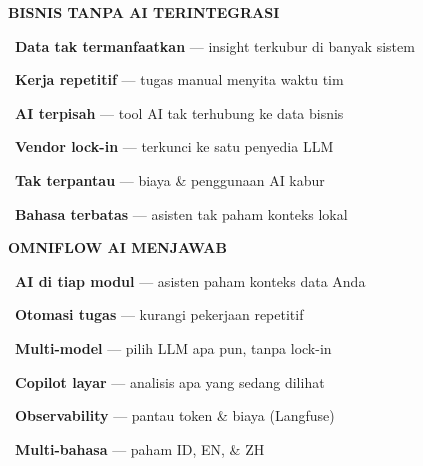 \documentclass[a4paper]{article}
\begin{document}
\noindent
\begin{minipage}[t]{0.485\textwidth}
    \colorbox{RedLight}{%
        \begin{minipage}{\dimexpr\textwidth-2\fboxsep\relax}
            {\fontsize{10}{13}\selectfont\bfseries\color{RedText} BISNIS TANPA AI TERINTEGRASI}
        \end{minipage}}\par
    \vspace{4pt}

    {\fontsize{9.5}{13}\selectfont\color{TextDark}%
    \textbullet\ \textbf{Data tak termanfaatkan} --- insight terkubur di banyak sistem\par\vspace{4pt}%
    \textbullet\ \textbf{Kerja repetitif} --- tugas manual menyita waktu tim\par\vspace{4pt}%
    \textbullet\ \textbf{AI terpisah} --- tool AI tak terhubung ke data bisnis\par\vspace{4pt}%
    \textbullet\ \textbf{Vendor lock-in} --- terkunci ke satu penyedia LLM\par\vspace{4pt}%
    \textbullet\ \textbf{Tak terpantau} --- biaya \& penggunaan AI kabur\par\vspace{4pt}%
    \textbullet\ \textbf{Bahasa terbatas} --- asisten tak paham konteks lokal}%
\end{minipage}%
\hfill%
\begin{minipage}[t]{0.485\textwidth}
    \colorbox{BluePrimary}{%
        \begin{minipage}{\dimexpr\textwidth-2\fboxsep\relax}
            {\fontsize{10}{13}\selectfont\bfseries\color{White} OMNIFLOW AI MENJAWAB}
        \end{minipage}}\par
    \vspace{4pt}

    {\fontsize{9.5}{13}\selectfont\color{TextDark}%
    \textbullet\ \textbf{AI di tiap modul} --- asisten paham konteks data Anda\par\vspace{4pt}%
    \textbullet\ \textbf{Otomasi tugas} --- kurangi pekerjaan repetitif\par\vspace{4pt}%
    \textbullet\ \textbf{Multi-model} --- pilih LLM apa pun, tanpa lock-in\par\vspace{4pt}%
    \textbullet\ \textbf{Copilot layar} --- analisis apa yang sedang dilihat\par\vspace{4pt}%
    \textbullet\ \textbf{Observability} --- pantau token \& biaya (Langfuse)\par\vspace{4pt}%
    \textbullet\ \textbf{Multi-bahasa} --- paham ID, EN, \& ZH}%
\end{minipage}
\end{document}
